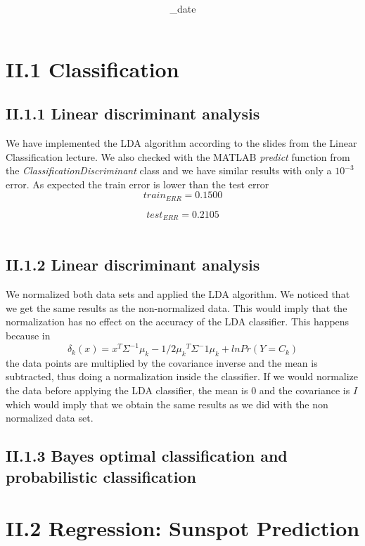 \documentclass{article}      %
\title{\textbf{\Course}\\\textbf{\Exam}}
\author{\Studentname}
\date{\Sub_date}      %
\begin{document}

\maketitle                   %

\section*{II.1 Classification}
\subsection*{II.1.1 Linear discriminant analysis}

We have implemented the LDA algorithm according to the slides from the Linear Classification lecture. We also checked with the MATLAB \emph{predict} function from the \emph{ClassificationDiscriminant} class and we have similar results with only a $10^{-3}$ error. As expected the train error is lower than the test error\\

\[ 
train_{ERR} = 0.1500 \]

\[ 
test_{ERR} = 0.2105 
\] \\

\subsection*{II.1.2 Linear discriminant analysis}

We normalized both data sets and applied the LDA algorithm. We noticed that we get the same results as the non-normalized data. This would imply that the normalization has no effect on the accuracy of the LDA classifier. This happens because in \[ \delta_k(x) = x^T\Sigma^{-1}\mu_k - 1/2{\mu_k}^T\Sigma^-1\mu_k + ln{Pr( Y = C_k)}\] the data points are multiplied by the covariance inverse and the mean is subtracted, thus doing a normalization inside the classifier. If we would normalize the data before applying the LDA classifier, the mean is 0 and the covariance is $I$ which would imply that we obtain the same results as we did with the non normalized data set.

\subsection*{II.1.3 Bayes optimal classification and probabilistic classification}

\section*{II.2 Regression: Sunspot Prediction}
\end{document}
